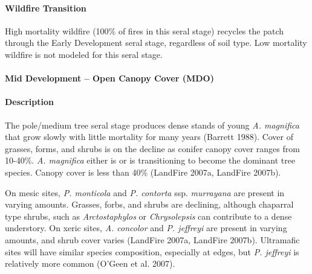 \paragraph{Wildfire Transition} High mortality wildfire (100\% of fires in this seral stage) recycles the patch through the Early Development seral stage, regardless of soil type. Low mortality wildfire is not modeled for this seral stage.

\noindent\hrulefill


\paragraph{Mid Development – Open Canopy Cover (MDO)} 

\paragraph{Description} The pole/medium tree seral stage produces dense stands of young \emph{A. magnifica} that grow slowly with little mortality for many years (Barrett 1988). Cover of grasses, forms, and shrubs is on the decline as conifer canopy cover ranges from 10-40\%. \emph{A. magnifica} either is or is transitioning to become the dominant tree species. Canopy cover is less than 40\% (LandFire 2007a, LandFire 2007b).

On mesic sites, \emph{P. monticola} and \emph{P. contorta} ssp. \emph{murrayana} are present in varying amounts. Grasses, forbs, and shrubs are declining, although chaparral type shrubs, such as \emph{Arctostaphylos} or \emph{Chrysolepsis} can contribute to a dense understory. On xeric sites, \emph{A. concolor} and \emph{P. jeffreyi} are present in varying amounts, and shrub cover varies (LandFire 2007a, LandFire 2007b). Ultramafic sites will have similar species composition, especially at edges, but \emph{P. jeffreyi} is relatively more common (O'Geen et al. 2007).


